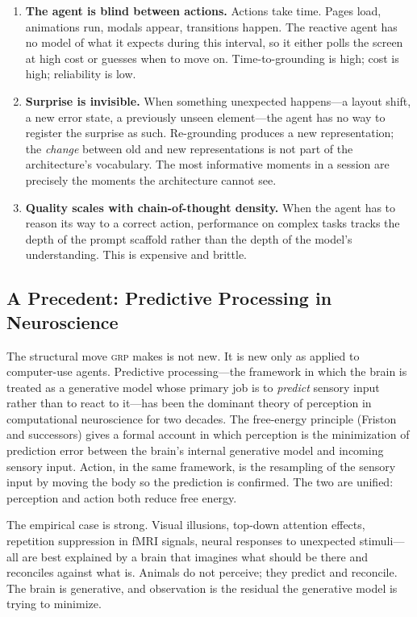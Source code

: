 \documentclass[12pt]{article}
\theoremstyle{definition}
\theoremstyle{remark}
\newcommand{\grp}{\textsc{grp}}
\begin{document}
\begin{enumerate}[leftmargin=*]
\item \textbf{The agent is blind between actions.} Actions take time.
  Pages load, animations run, modals appear, transitions happen. The
  reactive agent has no model of what it expects during this interval, so
  it either polls the screen at high cost or guesses when to move on.
  Time-to-grounding is high; cost is high; reliability is low.
\item \textbf{Surprise is invisible.} When something unexpected
  happens---a layout shift, a new error state, a previously unseen
  element---the agent has no way to register the surprise as such.
  Re-grounding produces a new representation; the \emph{change} between
  old and new representations is not part of the architecture's
  vocabulary. The most informative moments in a session are precisely
  the moments the architecture cannot see.
\item \textbf{Quality scales with chain-of-thought density.} When the
  agent has to reason its way to a correct action, performance on
  complex tasks tracks the depth of the prompt scaffold rather than the
  depth of the model's understanding. This is expensive and brittle.
\end{enumerate}

\subsection{A Precedent: Predictive Processing in Neuroscience}
\label{subsec:precedent}

The structural move \grp{} makes is not new. It is new only as applied
to computer-use agents. Predictive processing---the framework in which
the brain is treated as a generative model whose primary job is to
\emph{predict} sensory input rather than to react to it---has been the
dominant theory of perception in computational neuroscience for two
decades. The free-energy principle (Friston and successors) gives a
formal account in which perception is the minimization of prediction
error between the brain's internal generative model and incoming
sensory input. Action, in the same framework, is the resampling of the
sensory input by moving the body so the prediction is confirmed. The
two are unified: perception and action both reduce free energy.

The empirical case is strong. Visual illusions, top-down attention
effects, repetition suppression in fMRI signals, neural responses to
unexpected stimuli---all are best explained by a brain that imagines
what should be there and reconciles against what is. Animals do not
perceive; they predict and reconcile. The brain is generative, and
observation is the residual the generative model is trying to minimize.
\end{document}
